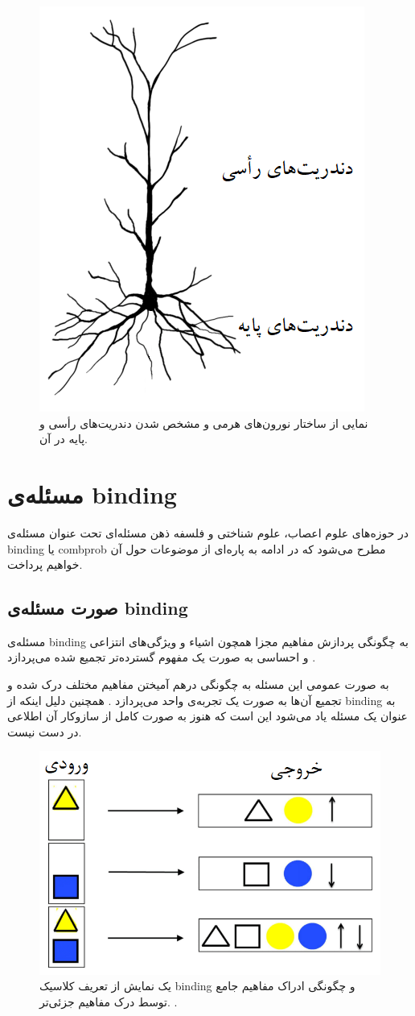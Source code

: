 \documentclass[12pt]{report}
\begin{document}
	\begin{figure}[H]
		\centering
		\includegraphics[width=0.5\linewidth]{pyramidal.png}
		\caption[NS]{
			نمایی از ساختار نورون‌های هرمی و مشخص شدن دندریت‌های رأسی و پایه در آن.
		}
		\label{fig:pyramidal}
	\end{figure}
	
	\section{مسئله‌ی \gls{binding}}
	
	در حوزه‌های علوم اعصاب، علوم شناختی و فلسفه ذهن مسئله‌ای تحت عنوان مسئله‌ی \gls{binding}
	یا \gls{combprob}
	مطرح می‌شود که در ادامه به پاره‌ای از موضوعات حول آن خواهیم پرداخت.
	
	\subsection{صورت مسئله‌ی \gls{binding}}
	
	مسئله‌ی \gls{binding} به چگونگی پردازش مفاهیم مجزا همچون اشیاء و ویژگی‌های انتزاعی و احساسی به صورت یک مفهوم گسترده‌تر تجمیع شده می‌پردازد
	\cite{REVONSUO1999123}.
	
	به صورت عمومی این مسئله به چگونگی در‌هم آمیختن مفاهیم مختلف درک شده و تجمیع آن‌ها به صورت یک تجربه‌ی واحد می‌پردازد
	\cite{Feldman2012}.
	همچنین دلیل اینکه از \gls{binding} به عنوان یک مسئله یاد می‌شود این است که هنوز به صورت کامل از سازوکار آن اطلاعی در دست نیست.
	
	\begin{figure}[H]
		\centering
		\includegraphics[width=0.7\linewidth]{binding.png}
		\caption[NS]{
			یک نمایش از تعریف کلاسیک \gls{binding} و چگونگی ادراک مفاهیم جامع توسط درک مفاهیم جزئی‌تر.
			\cite{velic2012}.
		}
		\label{fig:binding}
	\end{figure}
	
\end{document}
